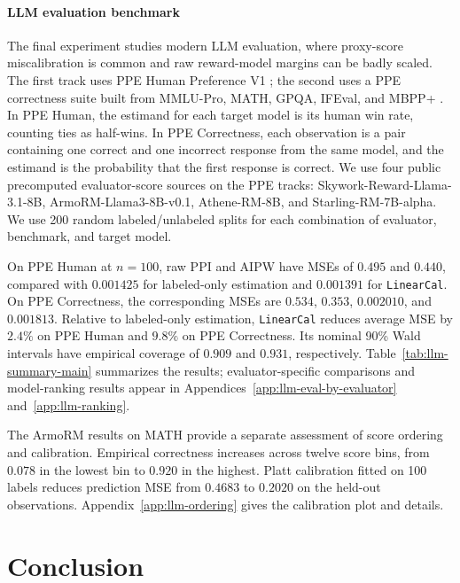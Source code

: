 \documentclass{article}
\theoremstyle{plain}
\theoremstyle{definition}
\newcommand{\1}{\mathbf{1}}
\begin{document}
\paragraph{LLM evaluation benchmark}  The final experiment studies modern LLM evaluation, where proxy-score miscalibration is common and raw reward-model margins can be badly scaled. The first track uses PPE Human Preference V1 \citep{frick2025evaluate}; the second uses a PPE correctness suite built from MMLU-Pro, MATH, GPQA, IFEval, and MBPP+ \citep{frick2025evaluate,wang2024mmlupro,hendrycksmath2021,rein2024gpqa,zhou2023instructionfollowing,liu2023evalplus}.
In PPE Human, the estimand for each target model is its human win rate,
counting ties as half-wins. In PPE Correctness, each observation is a pair
containing one correct and one incorrect response from the same model, and
the estimand is the probability that the first response is correct.
We use four public precomputed evaluator-score sources on the PPE tracks: Skywork-Reward-Llama-3.1-8B, ArmoRM-Llama3-8B-v0.1, Athene-RM-8B, and Starling-RM-7B-alpha. We use 200 random labeled/unlabeled splits for each combination of evaluator, benchmark, and target model.

On PPE Human at \(n=100\), raw PPI and AIPW have MSEs of \(0.495\) and
\(0.440\), compared with \(0.001425\) for labeled-only estimation and
\(0.001391\) for \texttt{LinearCal}. On PPE Correctness, the corresponding
MSEs are \(0.534\), \(0.353\), \(0.002010\), and \(0.001813\). Relative to
labeled-only estimation, \texttt{LinearCal} reduces average MSE by \(2.4\%\)
on PPE Human and \(9.8\%\) on PPE Correctness. Its nominal 90\% Wald
intervals have empirical coverage of \(0.909\) and \(0.931\), respectively.
Table~\ref{tab:llm-summary-main} summarizes the results; evaluator-specific
comparisons and model-ranking results appear in
Appendices~\ref{app:llm-eval-by-evaluator} and~\ref{app:llm-ranking}.

The ArmoRM results on MATH provide a separate assessment of score ordering
and calibration. Empirical correctness increases across twelve score bins,
from \(0.078\) in the lowest bin to \(0.920\) in the highest. Platt
calibration fitted on 100 labels reduces prediction MSE from \(0.4683\) to
\(0.2020\) on the held-out observations. Appendix~\ref{app:llm-ordering}
gives the calibration plot and details.

\section{Conclusion}
\end{document}
